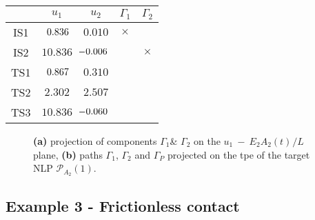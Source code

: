 \begin{table}[t]
	\centering
	\begin{minipage}{0.45\textwidth}
		\label{table:TABLE_CH4EX2}
		\small
		\renewcommand{\arraystretch}{1.25}
		\begin{tabular}{c c c c c}
			\hline\hline
			& $u_1$ & $u_2$ & $\mathit{\Gamma}_1$ & $\mathit{\Gamma}_2$ \\
			\hline
			IS1 & \hspace{2.5pt}$\hspace{2.5pt} 0.836$  & $0.010$  & $\times$   
			&            \\
			IS2 & $10.836$ & $\hspace{-5.5pt}-0.006$ &            & $\times$   
			\\
			TS1 & \hspace{2.5pt}$ \hspace{2.5pt}0.867$  & $0.310$  & \checkmark 
			&            \\
			TS2 & \hspace{5pt}$2.302$  & $2.507$  & \checkmark &            \\
			TS3 & $10.836$ & $\hspace{-6pt}-0.060$ &            & \checkmark \\
			\hline\hline
		\end{tabular}
	\end{minipage}
\end{table}

\begin{figure*}[t]
	\centering
	\qquad
	\caption{\textbf{(a)} projection of components
		$\mathit{\Gamma}_1$\& $\mathit{\Gamma}_2$ on the $u_1\ -\
		E_2A_2(t)^{}/L$ plane, \textbf{(b)} paths $\mathit{\Gamma}_1$, 
		$\mathit{\Gamma}_2$
		and $\mathit{\Gamma_P}$ projected on the \acrshort{tpe} of the target 
		NLP
		$\bm{\mathcal{P}}_{A_2}(1)$.}%
	\label{fig:FIG36}%
\end{figure*}

\subsection{Example 3 - Frictionless contact}

